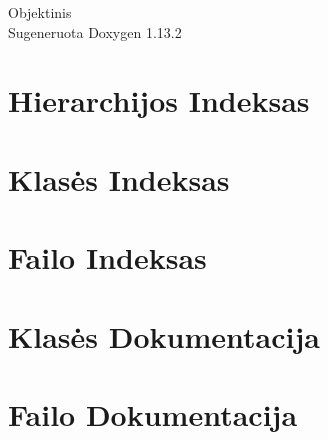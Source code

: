 \documentclass[twoside]{book}
\newcommand{\+}{\discretionary{\mbox{\scriptsize$\hookleftarrow$}}{}{}}
\newcommand{\clearemptydoublepage}{%
    \newpage{\pagestyle{empty}\cleardoublepage}%
  }
\begin{document}
  \raggedbottom
    \hypersetup{pageanchor=false,
                bookmarksnumbered=true,
                pdfencoding=unicode
               }
  \begin{titlepage}
  \vspace*{7cm}
  \begin{center}%
  {\Large Objektinis}\\
  \vspace*{1cm}
  {\large Sugeneruota Doxygen 1.13.2}\\
  \end{center}
  \end{titlepage}
  \clearemptydoublepage
  \tableofcontents
  \clearemptydoublepage
  \hypersetup{pageanchor=true}

\chapter{Hierarchijos Indeksas}

\chapter{Klasės Indeksas}

\chapter{Failo Indeksas}

\chapter{Klasės Dokumentacija}



\chapter{Failo Dokumentacija}




















  \backmatter
  \newpage
  \clearemptydoublepage
  \printindex
\end{document}
